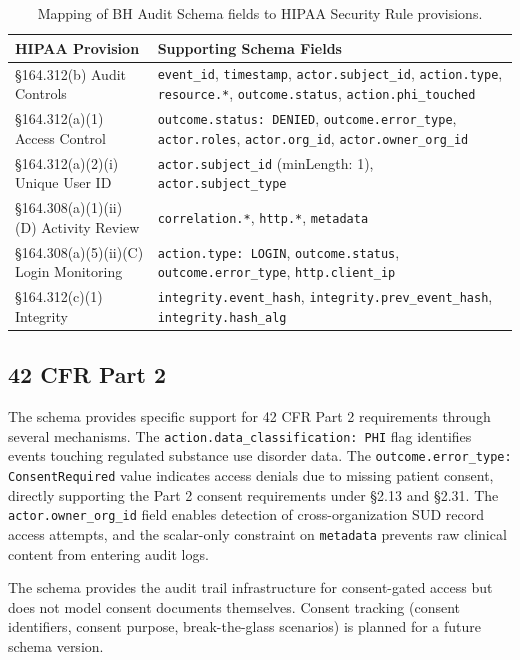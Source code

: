 \documentclass[11pt,a4paper]{article}
\begin{document}
\begin{table}[H]
\centering
\caption{Mapping of BH Audit Schema fields to HIPAA Security Rule provisions.}
\label{tab:hipaa}
\small
\begin{tabularx}{\textwidth}{lX}
\toprule
\textbf{HIPAA Provision} & \textbf{Supporting Schema Fields} \\
\midrule
\S164.312(b) Audit Controls & \texttt{event\_id}, \texttt{timestamp}, \texttt{actor.subject\_id}, \texttt{action.type}, \texttt{resource.*}, \texttt{outcome.status}, \texttt{action.phi\_touched} \\
\S164.312(a)(1) Access Control & \texttt{outcome.status: DENIED}, \texttt{outcome.error\_type}, \texttt{actor.roles}, \texttt{actor.org\_id}, \texttt{actor.owner\_org\_id} \\
\S164.312(a)(2)(i) Unique User ID & \texttt{actor.subject\_id} (minLength: 1), \texttt{actor.subject\_type} \\
\S164.308(a)(1)(ii)(D) Activity Review & \texttt{correlation.*}, \texttt{http.*}, \texttt{metadata} \\
\S164.308(a)(5)(ii)(C) Login Monitoring & \texttt{action.type: LOGIN}, \texttt{outcome.status}, \texttt{outcome.error\_type}, \texttt{http.client\_ip} \\
\S164.312(c)(1) Integrity & \texttt{integrity.event\_hash}, \texttt{integrity.prev\_event\_hash}, \texttt{integrity.hash\_alg} \\
\bottomrule
\end{tabularx}
\end{table}

\subsection{42 CFR Part 2}

The schema provides specific support for 42 CFR Part 2 requirements through several mechanisms. The \texttt{action.data\_classification: PHI} flag identifies events touching regulated substance use disorder data. The \texttt{outcome.error\_type: ConsentRequired} value indicates access denials due to missing patient consent, directly supporting the Part 2 consent requirements under \S2.13 and \S2.31. The \texttt{actor.owner\_org\_id} field enables detection of cross-organization SUD record access attempts, and the scalar-only constraint on \texttt{metadata} prevents raw clinical content from entering audit logs.

The schema provides the audit trail infrastructure for consent-gated access but does not model consent documents themselves. Consent tracking (consent identifiers, consent purpose, break-the-glass scenarios) is planned for a future schema version.
\end{document}
